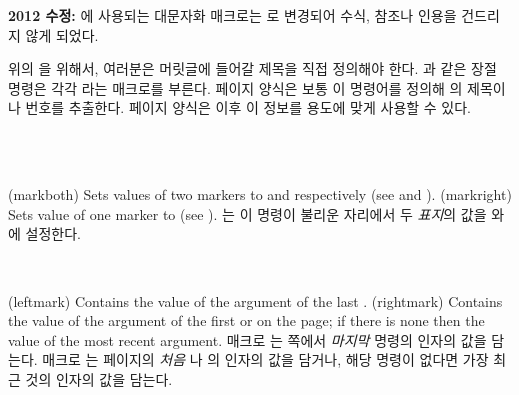 \textbf{2012 수정:} 에 사용되는 대문자화 매크로는
로 변경되어 수식, 참조나 인용을 건드리지 않게 되었다.

위의 을 위해서, 여러분은 머릿글에 들어갈
제목을 직접 정의해야 한다.
과 같은 장절 명령은 각각 라는 매크로를 부른다.
페이지 양식은 보통 이 명령어를 정의해 의 제목이나 번호를 추출한다.
페이지 양식은 이후 이 정보를 용도에 맞게 사용할 수 있다.

\begin{syntax}
\cmd{\markboth} \\
\cmd{\markright} \\
\end{syntax}
\glossary(markboth)%
  {}%
  {Sets values of two markers to  and  respectively
   (see  and ).}
\glossary(markright)%
  {}%
  {Sets value of one marker to  (see ).}
\cmd{\markboth}는 이 명령이 불리운 자리에서 두 \emph{표지}의
값을 와 에 설정한다.

\begin{syntax}
\cmd{\leftmark} \cmd{\rightmark} \\
\end{syntax}
\glossary(leftmark)%
  {}%
  {Contains the value of the  argument of the last .}
\glossary(rightmark)%
  {}%
  {Contains the value of the  argument of the first 
   or  on the page; if there is none then the value of the most
   recent  argument.}
매크로 \cmd{\leftmark}는 쪽에서 \emph{마지막} \cmd{\markboth} 명령의
 인자의 값을 담는다.
매크로 \cmd{\rightmark}는 페이지의 \emph{처음} \cmd{\markboth}나
\cmd{\markright}의  인자의 값을 담거나, 해당 명령이 없다면 가장
최근 것의  인자의 값을 담는다.

